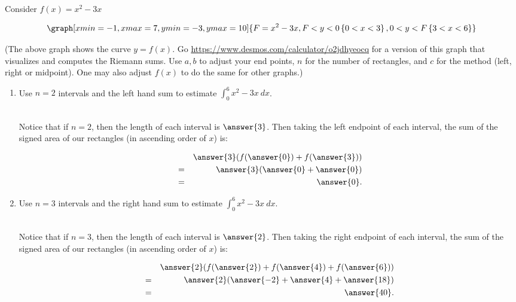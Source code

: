 \documentclass{ximera}
\begin{document}
\begin{question}
Consider $f(x)=x^2-3x$

\begin{onlineOnly}
$$\graph[xmin=-1, xmax=7, ymin=-3, ymax=10]{F=x^2-3x, F<y<0\left\{0<x<3\right\},0<y<F\left\{3<x<6\right\}}$$
\end{onlineOnly}
(The above graph shows the curve $y=f(x)$. Go  \url{https://www.desmos.com/calculator/o2jdhyeocq} for a version of this graph that visualizes and computes  the Riemann sums.  Use $a, b$ to adjust your end points, $n$ for the number of rectangles, and $c$ for the method (left, right or midpoint).  One may also adjust $f(x)$ to do the same for other graphs.)


\begin{enumerate}
\item Use $n=2$ intervals and the left hand sum to estimate $\displaystyle\int_0^6 x^2-3x\ dx$. \\ \\
\begin{explanation}
Notice that if $n=2$, then the length of each interval is $\answer{3}$.  Then taking the left endpoint of each interval, the sum of the signed area of our rectangles (in ascending order of $x$) is: 

\begin{eqnarray*}
&&\answer{3}(f(\answer{0})+f(\answer{3}))\\
&=&\answer{3}(\answer{0}+\answer{0})\\
&=&\answer{0}.
\end{eqnarray*}

\end{explanation}




\item Use $n=3$ intervals and the right hand sum to estimate $\displaystyle\int_0^6 x^2-3x\ dx$. \\ \\
\begin{explanation}
Notice that if $n=3$, then the length of each interval is $\answer{2}$.  Then taking the right endpoint of each interval, the sum of the signed area of our rectangles (in ascending order of $x$) is: 

\begin{eqnarray*}
&&\answer{2}(f(\answer{2})+f(\answer{4})+f(\answer{6}))\\
&=&\answer{2}(\answer{-2}+\answer{4}+\answer{18})\\
&=&\answer{40}.
\end{eqnarray*}


\end{explanation}
\end{enumerate}
\end{question}
\end{document}
